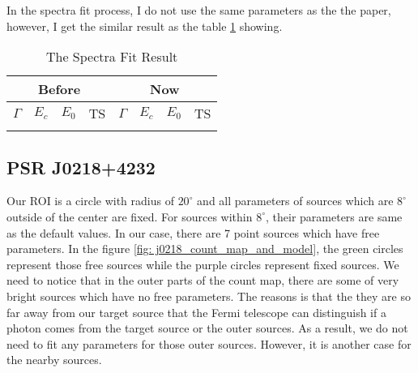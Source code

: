 \documentclass[12pt]{report}
\begin{document}
            In the spectra fit process, I do not use the same parameters as the the paper, however, I get the 
            similar result as the table \ref{table: previous_result_comparison} showing. 

            \begin{table}[!ht]
              \centering
              \begin{tabular}{|c|c|c|c|c|c|c|c|} 
                \hline 
                \multicolumn{4}{|c|}{Before} & \multicolumn{4}{|c|}{Now} \\ 
                \hline 
                $\Gamma$ & $E_c$ & $E_0$ & TS &  $\Gamma$ & $E_c$ & $E_0$ & TS \\
                \hline
                \caption{The Spectra Fit Result}
                \label{table: previous_result_comparison}

              \end{tabular}
            \end{table}

          

        \subsection{PSR J0218+4232}
          \label{j0218}
          Our ROI is a circle with radius of $20^\circ$ and all parameters of sources which are $8^\circ$ outside 
          of the center are fixed. For sources within $8^\circ$, their parameters are same as the default values. 
          In our case, there are 7 point sources which have free parameters. In the figure 
          \ref{fig: j0218_count_map_and_model}, the green circles represent those free sources while the purple circles 
          represent fixed sources. We need to notice that in the outer parts of the count map, there are some of very 
          bright sources which have no free parameters. The reasons is that the they are so far away from our target source
          that the Fermi telescope can distinguish if a photon comes from the target source or the outer sources.
          As a result, we do not need to fit any parameters for those outer sources. 
          However, it is another case for the nearby sources. 
          
\end{document}
